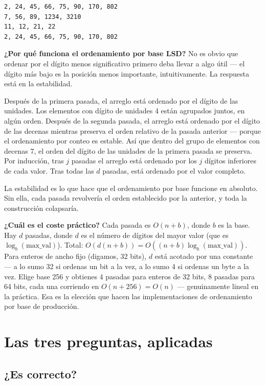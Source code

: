 \documentclass[11pt,a4paper]{article}
\begin{document}
\begin{verbatim}
2, 24, 45, 66, 75, 90, 170, 802
7, 56, 89, 1234, 3210
11, 12, 21, 22
2, 24, 45, 66, 75, 90, 170, 802
\end{verbatim}

\textbf{¿Por qué funciona el ordenamiento por base LSD?} No es obvio que ordenar por el dígito menos significativo primero deba llevar a algo útil --- el dígito más bajo es la posición menos importante, intuitivamente. La respuesta está en la estabilidad.

Después de la primera pasada, el arreglo está ordenado por el dígito de las unidades. Los elementos con dígito de unidades 4 están agrupados juntos, en algún orden. Después de la segunda pasada, el arreglo está ordenado por el dígito de las decenas mientras preserva el orden relativo de la pasada anterior --- porque el ordenamiento por conteo es estable. Así que dentro del grupo de elementos con decenas 7, el orden del dígito de las unidades de la primera pasada se preserva. Por inducción, tras $j$ pasadas el arreglo está ordenado por los $j$ dígitos inferiores de cada valor. Tras todas las $d$ pasadas, está ordenado por el valor completo.

La estabilidad es lo que hace que el ordenamiento por base funcione en absoluto. Sin ella, cada pasada revolvería el orden establecido por la anterior, y toda la construcción colapsaría.

\textbf{¿Cuál es el coste práctico?} Cada pasada es $O(n + b)$, donde $b$ es la base. Hay $d$ pasadas, donde $d$ es el número de dígitos del mayor valor (que es $\log_b(\text{max\_val})$). Total: $O(d(n+b)) = O((n+b) \log_b(\text{max\_val}))$. Para enteros de ancho fijo (digamos, 32 bits), $d$ está acotado por una constante --- a lo sumo 32 si ordenas un bit a la vez, a lo sumo 4 si ordenas un byte a la vez. Elige base 256 y obtienes 4 pasadas para enteros de 32 bits, 8 pasadas para 64 bits, cada una corriendo en $O(n + 256) = O(n)$ --- genuinamente lineal en la práctica. Esa es la elección que hacen las implementaciones de ordenamiento por base de producción.

\section{Las tres preguntas, aplicadas}

\subsection*{¿Es correcto?}
\end{document}
